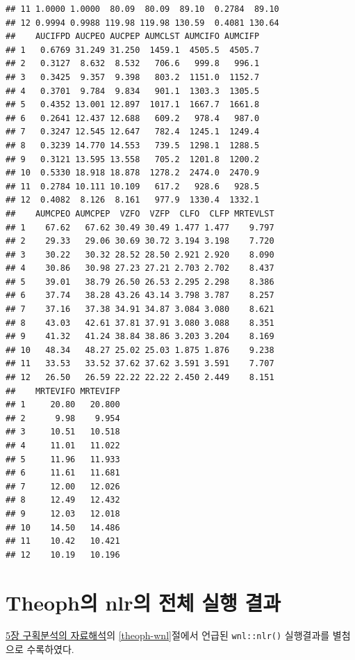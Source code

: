 \documentclass[
  11pt,
  krantz2, a4paper, twoside]{krantz}
\theoremstyle{definition}
\theoremstyle{definition}
\theoremstyle{definition}
\theoremstyle{definition}
\theoremstyle{remark}
\begin{document}
\begin{verbatim}
## 11 1.0000 1.0000  80.09  80.09  89.10  0.2784  89.10
## 12 0.9994 0.9988 119.98 119.98 130.59  0.4081 130.64
##    AUCIFPD AUCPEO AUCPEP AUMCLST AUMCIFO AUMCIFP
## 1   0.6769 31.249 31.250  1459.1  4505.5  4505.7
## 2   0.3127  8.632  8.532   706.6   999.8   996.1
## 3   0.3425  9.357  9.398   803.2  1151.0  1152.7
## 4   0.3701  9.784  9.834   901.1  1303.3  1305.5
## 5   0.4352 13.001 12.897  1017.1  1667.7  1661.8
## 6   0.2641 12.437 12.688   609.2   978.4   987.0
## 7   0.3247 12.545 12.647   782.4  1245.1  1249.4
## 8   0.3239 14.770 14.553   739.5  1298.1  1288.5
## 9   0.3121 13.595 13.558   705.2  1201.8  1200.2
## 10  0.5330 18.918 18.878  1278.2  2474.0  2470.9
## 11  0.2784 10.111 10.109   617.2   928.6   928.5
## 12  0.4082  8.126  8.161   977.9  1330.4  1332.1
##    AUMCPEO AUMCPEP  VZFO  VZFP  CLFO  CLFP MRTEVLST
## 1    67.62   67.62 30.49 30.49 1.477 1.477    9.797
## 2    29.33   29.06 30.69 30.72 3.194 3.198    7.720
## 3    30.22   30.32 28.52 28.50 2.921 2.920    8.090
## 4    30.86   30.98 27.23 27.21 2.703 2.702    8.437
## 5    39.01   38.79 26.50 26.53 2.295 2.298    8.386
## 6    37.74   38.28 43.26 43.14 3.798 3.787    8.257
## 7    37.16   37.38 34.91 34.87 3.084 3.080    8.621
## 8    43.03   42.61 37.81 37.91 3.080 3.088    8.351
## 9    41.32   41.24 38.84 38.86 3.203 3.204    8.169
## 10   48.34   48.27 25.02 25.03 1.875 1.876    9.238
## 11   33.53   33.52 37.62 37.62 3.591 3.591    7.707
## 12   26.50   26.59 22.22 22.22 2.450 2.449    8.151
##    MRTEVIFO MRTEVIFP
## 1     20.80   20.800
## 2      9.98    9.954
## 3     10.51   10.518
## 4     11.01   11.022
## 5     11.96   11.933
## 6     11.61   11.681
## 7     12.00   12.026
## 8     12.49   12.432
## 9     12.03   12.018
## 10    14.50   14.486
## 11    10.42   10.421
## 12    10.19   10.196
\end{verbatim}

\normalsize

\chapter{Theoph의 nlr의 전체 실행 결과}\label{Theoph_nlr}

\hyperref[ca-analysis]{5장 구획분석의 자료해석}의 \ref{theoph-wnl}절에서 언급된 \texttt{wnl::nlr()} 실행결과를 별첨으로 수록하였다.

\tiny
\end{document}
